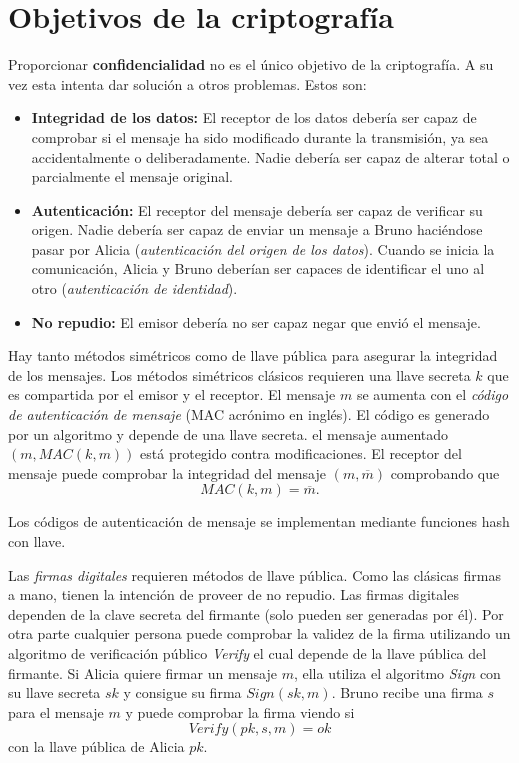 \documentclass[12pt]{book}
\theoremstyle{definition}
\begin{document}
\section{Objetivos de la criptografía}

Proporcionar \textbf{confidencialidad} no es el único objetivo de la criptografía. A su vez esta intenta dar solución a otros problemas. Estos son:

\begin{itemize}
\item \textbf{Integridad de los datos:} El receptor de los datos debería ser capaz de comprobar si el mensaje ha sido modificado durante la transmisión, ya sea accidentalmente o deliberadamente. Nadie debería ser capaz de alterar total o parcialmente el mensaje original.

\item \textbf{Autenticación:} El receptor del mensaje debería ser capaz de verificar su origen. Nadie debería ser capaz de enviar un mensaje a Bruno haciéndose pasar por Alicia (\textit{autenticación del origen de los datos}). Cuando se inicia la comunicación, Alicia y Bruno deberían ser capaces de identificar el uno al otro (\textit{autenticación de identidad}).

\item \textbf{No repudio:} El emisor debería no ser capaz negar que envió el mensaje.
\end{itemize}

Hay tanto métodos simétricos como de llave pública para asegurar la integridad de los mensajes. Los métodos simétricos clásicos requieren una llave secreta $k$ que es compartida por el emisor y el receptor. El mensaje $m$ se aumenta con el \textit{código de autenticación de mensaje} (MAC acrónimo en inglés). El código es generado por un algoritmo y depende de una llave secreta. el mensaje aumentado $(m,MAC(k,m))$ está protegido contra modificaciones. El receptor del mensaje puede comprobar la integridad del mensaje $(m,\overline{m})$ comprobando que
$$MAC(k,m)=\overline{m}.$$

Los códigos de autenticación de mensaje se implementan mediante funciones hash con llave.

Las \textit{firmas digitales} requieren métodos de llave pública. Como las clásicas firmas a mano, tienen la intención de proveer de no repudio. Las firmas digitales dependen de la clave secreta del firmante (solo pueden ser generadas por él). Por otra parte cualquier persona puede comprobar la validez de la firma utilizando un algoritmo de verificación público \textit{Verify} el cual depende de la llave pública del firmante. Si Alicia quiere firmar un mensaje $m$, ella utiliza el algoritmo \textit{Sign} con su llave secreta $sk$ y consigue su firma $Sign(sk,m)$. Bruno recibe una firma $s$ para el mensaje $m$ y puede comprobar la firma viendo si
$$Verify(pk,s,m)=ok$$
con la llave pública de Alicia $pk$.
\end{document}
